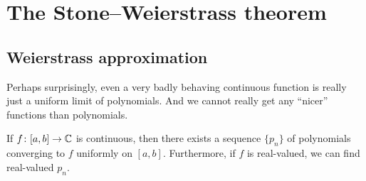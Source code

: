 
\sectionnewpage
\section{The Stone--Weierstrass theorem}
\label{sec:stoneweier}


\subsection{Weierstrass approximation}

Perhaps surprisingly, even a very badly behaving continuous function is really
just a uniform limit of polynomials.
And we cannot really get any ``nicer''
functions than polynomials.

\begin{thm}
If $f \colon [a,b] \to {\mathbb{C}}$ is continuous, then there exists a sequence $\{
p_n \}$ of polynomials converging to $f$ uniformly on $[a,b]$.
Furthermore, if $f$ is real-valued, we can find real-valued $p_n$.
\end{thm}

